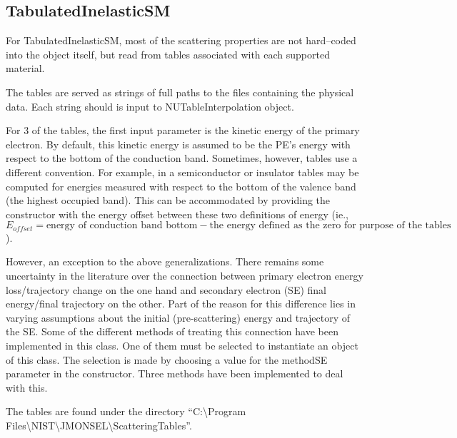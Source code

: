 \subsection{TabulatedInelasticSM}
For TabulatedInelasticSM, most of the scattering properties are not hard--coded into the object itself, but read from tables associated with each supported material.

The tables are served as strings of full paths to the files containing the physical data. Each string should is input to NUTableInterpolation object. 

For 3 of the tables, the first input parameter is the kinetic energy of the primary electron. By default, this kinetic energy is assumed to be the PE's energy with respect to the bottom of the conduction band. Sometimes, however, tables use a different convention. For example, in a semiconductor or insulator tables may be computed for energies measured with respect to the bottom of the valence band (the highest occupied band). This can be accommodated by providing the constructor with the energy offset between these two definitions of energy (ie., $E_{offset} = \text{energy of conduction band bottom} - \text{the energy defined as the zero for purpose of the tables}$).

However, an exception to the above generalizations. There remains some uncertainty in the literature over the connection between primary electron energy loss/trajectory change on the one hand and secondary electron (SE) final energy/final trajectory on the other. Part of the reason for this difference lies in varying assumptions about the initial (pre-scattering) energy and trajectory of the SE. Some of the different methods of treating this connection have been implemented in this class. One of them must be selected to instantiate an object of this class. The selection is made by choosing a value for the methodSE parameter in the constructor. Three methods have been implemented to deal with this.

The tables are found under the directory ``C:\textbackslash Program Files\textbackslash NIST\textbackslash JMONSEL\textbackslash ScatteringTables''.

